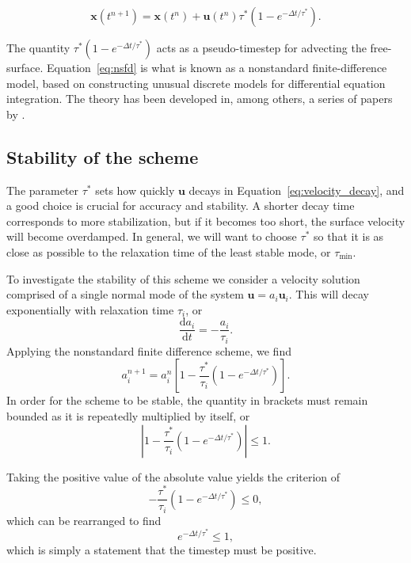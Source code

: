 \documentclass[preprint,12pt,authoryear]{elsarticle}
\newif\ifdetail
\begin{document}
\begin{equation}
\mathbf{x}(t^{n+1}) = \mathbf{x}(t^n) + \mathbf{u}(t^{n}) \tau^* \left(1-e^{-\Delta t/\tau^*} \right).
\label{eq:nsfd}
\end{equation}

The quantity $\tau^*(1-e^{-\Delta t / \tau^*})$ acts as a pseudo-timestep for advecting the free-surface.
Equation~\eqref{eq:nsfd} is what is known as a nonstandard finite-difference model, based on
constructing unusual discrete models for differential equation integration.
The theory has been developed in, among others, a series of papers by
\citet{mickens1994nonstandard, mickens2002nonstandard, mickens2005dynamic}.

\subsection{Stability of the scheme}
The parameter $\tau^*$ sets how quickly $\mathbf{u}$ decays in Equation~\eqref{eq:velocity_decay}, and a good 
choice is crucial for accuracy and stability. A shorter decay time corresponds to more stabilization,
but if it becomes too short, the surface velocity will become overdamped. In general, we will want 
to choose $\tau^*$ so that it is as close as possible to the relaxation time of the least stable mode, or $\tau_{\mathrm{min}}$.

To investigate the stability of this scheme we consider a velocity solution comprised of 
a single normal mode of the system $\mathbf{u} = a_i \mathbf{u}_i$.
This will decay exponentially with relaxation time $\tau_i$, or
\begin{equation}
\frac{\text{d} a_i} {\text{d}t} = - \frac{ a_i }{\tau_i}.
\end{equation}
Applying the nonstandard finite difference scheme, we find
\begin{equation}
a_i^{n+1} = a_i^{n} \left[ 1 - \frac{\tau^*}{\tau_i} \left(1-e^{-\Delta t/\tau^*} \right) \right].
\label{eq:recursion}
\end{equation}
In order for the scheme to be stable, the quantity in brackets must remain bounded as it is repeatedly multiplied by itself, or 
\begin{equation}
\left| 1 - \frac{\tau^*}{\tau_i} \left(1-e^{-\Delta t/\tau^*} \right) \right| \le 1.
\end{equation}

\ifdetail
Taking the positive value of the absolute value yields the criterion of 
\begin{equation}
- \frac{\tau^*}{\tau_i} \left(1-e^{-\Delta t/\tau^*} \right) \le 0,
\end{equation}
which can be rearranged to find
\begin{equation}
e^{-\Delta t/\tau^*} \le 1,
\end{equation}
which is simply a statement that the timestep must be positive.
\end{document}
